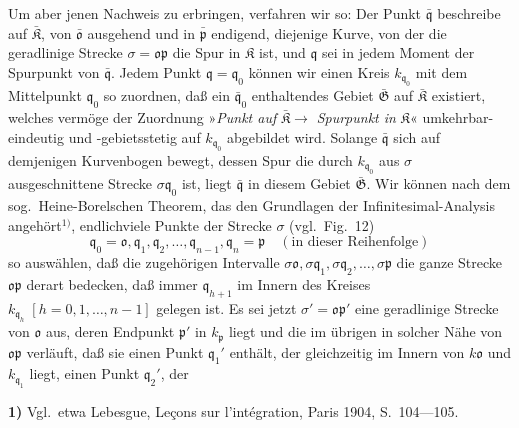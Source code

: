 \documentclass{article}
\begin{document}
Um aber jenen Nachweis zu erbringen, verfahren wir so: Der Punkt $\bar{\mathfrak{q}}$ beschreibe auf $\bar{\mathfrak{K}}$, von $\bar{\mathfrak{o}}$ ausgehend und in $\bar{\mathfrak{p}}$ endigend, diejenige Kurve, von der die geradlinige Strecke $\sigma = \mathfrak{o}\mathfrak{p}$ die Spur in $\mathfrak{K}$ ist, und $\mathfrak{q}$ sei in jedem Moment der Spurpunkt von $\bar{\mathfrak{q}}$. Jedem Punkt $\mathfrak{q} = \mathfrak{q}_0$ können wir einen Kreis $k_{\mathfrak{q}_0}$ mit dem Mittelpunkt $\mathfrak{q}_0$ so zuordnen, daß ein $\bar{\mathfrak{q}}_0$ enthaltendes Gebiet $\bar{\mathfrak{G}}$ auf $\bar{\mathfrak{K}}$ existiert, welches vermöge der Zuordnung »\emph{Punkt auf} $\bar{\mathfrak{K}} \to$ \emph{Spurpunkt in} $\mathfrak{K}$« umkehrbar-eindeutig und -gebietsstetig auf $k_{\mathfrak{q}_0}$ abgebildet wird. Solange $\bar{\mathfrak{q}}$ sich auf demjenigen Kurvenbogen bewegt, dessen Spur die durch $k_{\mathfrak{q}_0}$ aus $\sigma$ ausgeschnittene Strecke $\sigma\mathfrak{q}_0$ ist, liegt $\bar{\mathfrak{q}}$ in diesem Gebiet $\bar{\mathfrak{G}}$. Wir können nach dem sog.\ Heine-Borelschen Theorem, das den Grundlagen der Infinitesimal-Analysis angehört${}^{1)}$, endlichviele Punkte der Strecke $\sigma$ (vgl.\ Fig.~12)
\[ \mathfrak{q}_0 = \mathfrak{o}, \mathfrak{q}_1, \mathfrak{q}_2, \dots, \mathfrak{q}_{n-1}, \mathfrak{q}_n = \mathfrak{p} \quad (\text{in dieser Reihenfolge}) \]
so auswählen, daß die zugehörigen Intervalle $\sigma\mathfrak{o}, \sigma\mathfrak{q}_1, \sigma\mathfrak{q}_2, \dots, \sigma\mathfrak{p}$ die ganze Strecke $\mathfrak{o}\mathfrak{p}$ derart bedecken, daß immer $\mathfrak{q}_{h+1}$ im Innern des Kreises $k_{\mathfrak{q}_h}\;[h = 0, 1, \dots, n-1]$ gelegen ist. Es sei jetzt $\sigma' = \mathfrak{o}\mathfrak{p}'$ eine geradlinige Strecke von $\mathfrak{o}$ aus, deren Endpunkt $\mathfrak{p}'$ in $k_{\mathfrak{p}}$ liegt und die im übrigen in solcher Nähe von $\mathfrak{o}\mathfrak{p}$ verläuft, daß sie einen Punkt $\mathfrak{q}_1'$ enthält, der gleichzeitig im Innern von $k\mathfrak{o}$ und $k_{\mathfrak{q}_1}$ liegt, einen Punkt $\mathfrak{q}_2'$, der


\textbf{1)} Vgl.\ etwa Lebesgue, Leçons sur l'intégration, Paris 1904, S.\ 104---105.
\end{document}
